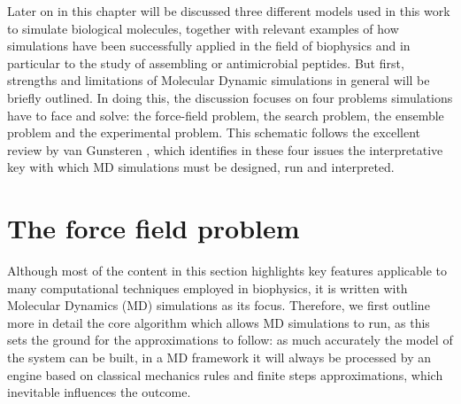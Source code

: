 Later on in this chapter will be discussed three different models used in this work to simulate biological molecules, together with relevant examples of how simulations have been successfully applied in the field of biophysics and in particular to the study of assembling or antimicrobial peptides.
%
But first, strengths and limitations of Molecular Dynamic simulations in general will be briefly outlined. In doing this, the discussion focuses on four problems simulations have to face and solve: the force-field problem, the search problem, the ensemble problem and the experimental problem. This schematic follows the excellent review by van Gunsteren \cite{...}, which identifies in these four issues the interpretative key with which MD simulations must be designed, run and interpreted.


\section{The force field problem}


Although most of the content in this section highlights key features applicable to many computational techniques employed in biophysics, it is written with Molecular Dynamics (MD) simulations as its focus. Therefore, we first outline more in detail the core algorithm which allows MD simulations to run, as this sets the ground for the approximations to follow: as much accurately the model of the system can be built, in a MD framework it will always be processed by an engine based on classical mechanics rules and finite steps approximations, which inevitable influences the outcome.

